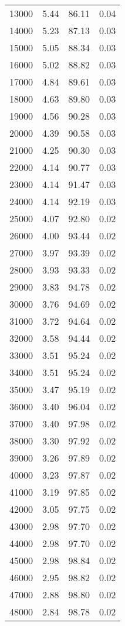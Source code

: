 \begin{table}[ht]
\begin{tabular}{rrrr}
  13000 & 5.44 & 86.11 & 0.04 \\ 
  14000 & 5.23 & 87.13 & 0.03 \\ 
  15000 & 5.05 & 88.34 & 0.03 \\ 
  16000 & 5.02 & 88.82 & 0.03 \\ 
  17000 & 4.84 & 89.61 & 0.03 \\ 
  18000 & 4.63 & 89.80 & 0.03 \\ 
  19000 & 4.56 & 90.28 & 0.03 \\ 
  20000 & 4.39 & 90.58 & 0.03 \\ 
  21000 & 4.25 & 90.30 & 0.03 \\ 
  22000 & 4.14 & 90.77 & 0.03 \\ 
  23000 & 4.14 & 91.47 & 0.03 \\ 
  24000 & 4.14 & 92.19 & 0.03 \\ 
  25000 & 4.07 & 92.80 & 0.02 \\ 
  26000 & 4.00 & 93.44 & 0.02 \\ 
  27000 & 3.97 & 93.39 & 0.02 \\ 
  28000 & 3.93 & 93.33 & 0.02 \\ 
  29000 & 3.83 & 94.78 & 0.02 \\ 
  30000 & 3.76 & 94.69 & 0.02 \\ 
  31000 & 3.72 & 94.64 & 0.02 \\ 
  32000 & 3.58 & 94.44 & 0.02 \\ 
  33000 & 3.51 & 95.24 & 0.02 \\ 
  34000 & 3.51 & 95.24 & 0.02 \\ 
  35000 & 3.47 & 95.19 & 0.02 \\ 
  36000 & 3.40 & 96.04 & 0.02 \\ 
  37000 & 3.40 & 97.98 & 0.02 \\ 
  38000 & 3.30 & 97.92 & 0.02 \\ 
  39000 & 3.26 & 97.89 & 0.02 \\ 
  40000 & 3.23 & 97.87 & 0.02 \\ 
  41000 & 3.19 & 97.85 & 0.02 \\ 
  42000 & 3.05 & 97.75 & 0.02 \\ 
  43000 & 2.98 & 97.70 & 0.02 \\ 
  44000 & 2.98 & 97.70 & 0.02 \\ 
  45000 & 2.98 & 98.84 & 0.02 \\ 
  46000 & 2.95 & 98.82 & 0.02 \\ 
  47000 & 2.88 & 98.80 & 0.02 \\ 
  48000 & 2.84 & 98.78 & 0.02 \\ 

\end{tabular}
\end{table}

